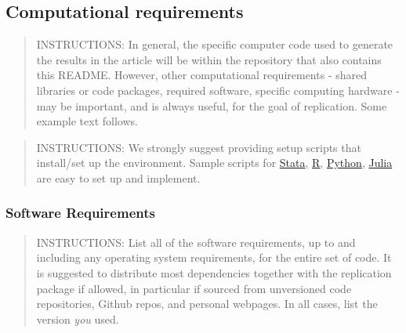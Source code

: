 \documentclass[
]{article}
\begin{document}
\hypertarget{computational-requirements}{%
\subsection{Computational
requirements}\label{computational-requirements}}

\begin{quote}
INSTRUCTIONS: In general, the specific computer code used to generate
the results in the article will be within the repository that also
contains this README. However, other computational requirements - shared
libraries or code packages, required software, specific computing
hardware - may be important, and is always useful, for the goal of
replication. Some example text follows.
\end{quote}

\begin{quote}
INSTRUCTIONS: We strongly suggest providing setup scripts that
install/set up the environment. Sample scripts for
\href{https://github.com/gslab-econ/template/blob/master/config/config_stata.do}{Stata},
\href{https://github.com/labordynamicsinstitute/paper-template/blob/master/programs/global-libraries.R}{R},
\href{https://pip.readthedocs.io/en/1.1/requirements.html}{Python},
\href{https://github.com/labordynamicsinstitute/paper-template/blob/master/programs/packages.jl}{Julia}
are easy to set up and implement.
\end{quote}

\hypertarget{software-requirements}{%
\subsubsection{Software Requirements}\label{software-requirements}}

\begin{quote}
INSTRUCTIONS: List all of the software requirements, up to and including
any operating system requirements, for the entire set of code. It is
suggested to distribute most dependencies together with the replication
package if allowed, in particular if sourced from unversioned code
repositories, Github repos, and personal webpages. In all cases, list
the version \emph{you} used.
\end{quote}
\end{document}
